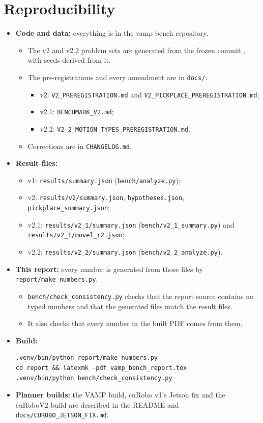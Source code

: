 \documentclass[11pt]{article}
\begin{document}
\section{Reproducibility}
\begin{itemize}
  \item \textbf{Code and data:} everything is in the vamp-bench repository.
  \begin{itemize}
    \item The v2 and v2.2 problem sets are generated from the frozen commit \texttt{\freezeHash}, with seeds derived from it.
    \item The pre-registrations and every amendment are in \texttt{docs/}:
    \begin{itemize}
      \item v2: \texttt{V2\_PREREGISTRATION.md} and \texttt{V2\_PICKPLACE\_PREREGISTRATION.md};
      \item v2.1: \texttt{BENCHMARK\_V2.md};
      \item v2.2: \texttt{V2\_2\_MOTION\_TYPES\_PREREGISTRATION.md}.
    \end{itemize}
    \item Corrections are in \texttt{CHANGELOG.md}.
  \end{itemize}
  \item \textbf{Result files:}
  \begin{itemize}
    \item v1: \texttt{results/summary.json} (\texttt{bench/analyze.py});
    \item v2: \texttt{results/v2/summary.json}, \texttt{hypotheses.json}, \texttt{pickplace\_summary.json};
    \item v2.1: \texttt{results/v2\_1/summary.json} (\texttt{bench/v2\_1\_summary.py}) and\\ \texttt{results/v2\_1/movel\_r2.json};
    \item v2.2: \texttt{results/v2\_2/summary.json} (\texttt{bench/v2\_2\_analyze.py}).
  \end{itemize}
  \item \textbf{This report:} every number is generated from those files by \texttt{report/make\_numbers.py}.
  \begin{itemize}
    \item \texttt{bench/check\_consistency.py} checks that the report source contains no typed numbers and that the generated files match the result files.
    \item It also checks that every number in the built PDF comes from them.
  \end{itemize}
  \item \textbf{Build:}
\begin{verbatim}
.venv/bin/python report/make_numbers.py
cd report && latexmk -pdf vamp_bench_report.tex
.venv/bin/python bench/check_consistency.py
\end{verbatim}
  \item \textbf{Planner builds:} the VAMP build, cuRobo v1's Jetson fix and the cuRoboV2 build are described in the README and \texttt{docs/CUROBO\_JETSON\_FIX.md}.
\end{itemize}
\end{document}
